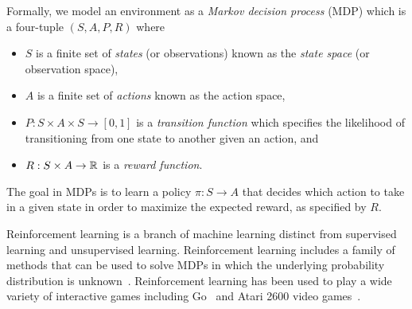 Formally, we model an environment as a \emph{Markov decision process} (MDP)
which is a four-tuple $(S, A, P, R)$ where
\begin{itemize}
  \setlength\itemsep{0em}
  \item
    $S$ is a finite set of \emph{states} (or observations) known as the
    \emph{state space} (or observation space),
  \item
    $A$ is a finite set of \emph{actions} known as the action space,
  \item
    $P: S \times A \times S \to [0, 1]$ is a \emph{transition function} which
    specifies the likelihood of transitioning from one state to another given
    an action, and
  \item
    $R: S \times A \to \mathbb{R}$ is a \emph{reward function}.
\end{itemize}

The goal in MDPs is to learn a policy $\pi : S \to A$ that decides which action
to take in a given state in order to maximize the expected reward, as specified
by $R$.

Reinforcement learning is a branch of machine learning distinct from supervised
learning and unsupervised learning. Reinforcement learning includes a family of
methods that can be used to solve MDPs in which the underlying probability
distribution is unknown~\cite{sutton1998reinforcement}.  Reinforcement learning
has been used to play a wide variety of interactive games including
Go~\cite{silver2016mastering} and Atari 2600 video games~\cite{mnih2015human}.
